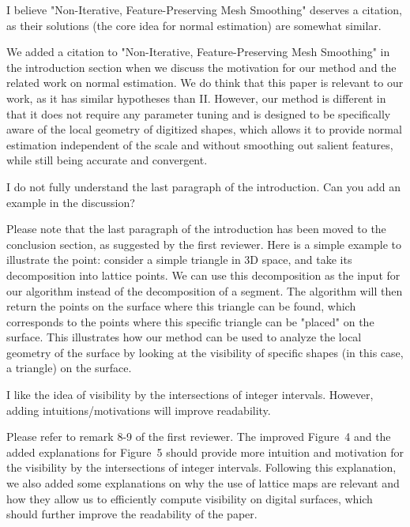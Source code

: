 \documentclass[10pt,french]{letter}
\begin{document}
  \begin{remark}
    I believe "Non-Iterative, Feature-Preserving Mesh Smoothing" deserves a
    citation, as their solutions (the core idea for normal estimation) are somewhat
    similar.
  \end{remark}
  \begin{response}
    We added a citation to "Non-Iterative, Feature-Preserving Mesh Smoothing" in the introduction section
    when we discuss the motivation for our method and the related work on normal estimation. We do think
    that this paper is relevant to our work, as it has similar hypotheses than II. However, our method
    is different in that it does not require any parameter tuning and is designed to be
    specifically aware of the local geometry of digitized shapes, which allows it to provide normal estimation
    independent of the scale and without smoothing out salient features, while still being accurate and convergent.
  \end{response}

  \begin{remark}
    I do not fully understand the last paragraph of the introduction. Can you add
    an example in the discussion?
  \end{remark}
  \begin{response}
    Please note that the last paragraph of the introduction has been moved to the conclusion section,
    as suggested by the first reviewer. Here is a simple example to illustrate the point: consider
    a simple triangle in 3D space, and take its decomposition into lattice points. We can use this
    decomposition as the input for our algorithm instead of the decomposition of a segment. The
    algorithm will then return the points on the surface where this triangle can be found, which
    corresponds to the points where this specific triangle can be "placed" on the surface. This
    illustrates how our method can be used to analyze the local geometry of the surface by looking at
    the visibility of specific shapes (in this case, a triangle) on the surface.
  \end{response}

  \begin{remark}
    I like the idea of visibility by the intersections of integer intervals. However, adding
    intuitions/motivations will improve readability.
  \end{remark}
  \begin{response}
    Please refer to remark 8-9 of the first reviewer. The improved Figure~4 and the added explanations
    for Figure~5 should provide more intuition and motivation for the visibility by the intersections
    of integer intervals. Following this explanation, we also added some explanations on why the use
    of lattice maps are relevant and how they allow us to efficiently compute visibility on digital
    surfaces, which should further improve the readability of the paper.
  \end{response}
\end{document}
